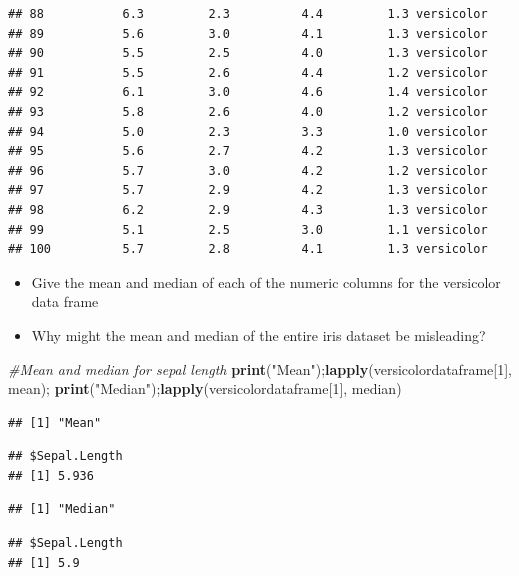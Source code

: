 \documentclass[]{article}
\newenvironment{Shaded}{\begin{snugshade}}{\end{snugshade}}
\newcommand{\CommentTok}[1]{\textcolor[rgb]{0.56,0.35,0.01}{\textit{#1}}}
\newcommand{\DecValTok}[1]{\textcolor[rgb]{0.00,0.00,0.81}{#1}}
\newcommand{\KeywordTok}[1]{\textcolor[rgb]{0.13,0.29,0.53}{\textbf{#1}}}
\newcommand{\NormalTok}[1]{#1}
\newcommand{\StringTok}[1]{\textcolor[rgb]{0.31,0.60,0.02}{#1}}
\providecommand{\tightlist}{%
  \setlength{\itemsep}{0pt}\setlength{\parskip}{0pt}}
\begin{document}
\begin{verbatim}
## 88           6.3         2.3          4.4         1.3 versicolor
## 89           5.6         3.0          4.1         1.3 versicolor
## 90           5.5         2.5          4.0         1.3 versicolor
## 91           5.5         2.6          4.4         1.2 versicolor
## 92           6.1         3.0          4.6         1.4 versicolor
## 93           5.8         2.6          4.0         1.2 versicolor
## 94           5.0         2.3          3.3         1.0 versicolor
## 95           5.6         2.7          4.2         1.3 versicolor
## 96           5.7         3.0          4.2         1.2 versicolor
## 97           5.7         2.9          4.2         1.3 versicolor
## 98           6.2         2.9          4.3         1.3 versicolor
## 99           5.1         2.5          3.0         1.1 versicolor
## 100          5.7         2.8          4.1         1.3 versicolor
\end{verbatim}

\begin{itemize}
\tightlist
\item
  Give the mean and median of each of the numeric columns for the
  versicolor data frame
\item
  Why might the mean and median of the entire iris dataset be
  misleading?
\end{itemize}

\begin{Shaded}
\begin{Highlighting}[]
\CommentTok{#Mean and median for sepal length}
\KeywordTok{print}\NormalTok{(}\StringTok{"Mean"}\NormalTok{);}\KeywordTok{lapply}\NormalTok{(versicolordataframe[}\DecValTok{1}\NormalTok{], mean); }\KeywordTok{print}\NormalTok{(}\StringTok{"Median"}\NormalTok{);}\KeywordTok{lapply}\NormalTok{(versicolordataframe[}\DecValTok{1}\NormalTok{], median)}
\end{Highlighting}
\end{Shaded}

\begin{verbatim}
## [1] "Mean"
\end{verbatim}

\begin{verbatim}
## $Sepal.Length
## [1] 5.936
\end{verbatim}

\begin{verbatim}
## [1] "Median"
\end{verbatim}

\begin{verbatim}
## $Sepal.Length
## [1] 5.9
\end{verbatim}
\end{document}
